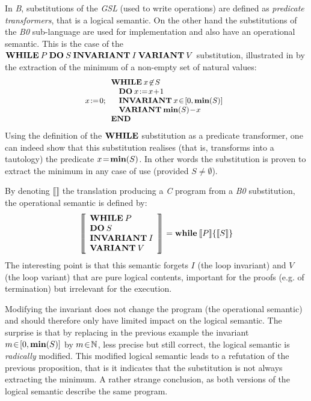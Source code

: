 \documentclass[conference]{IEEEtran}
\begin{document}
In \emph{B}, substitutions of the \emph{GSL} (used to write operations) are defined as
\emph{predicate transformers}, that is a logical semantic. On the other hand the substitutions
of the \emph{B0} sub-language are used for implementation and also have an operational
semantic. This is the case of the
{\small$\mathbf{WHILE}\:P\:\mathbf{DO}\:S\:\mathbf{INVARIANT}\:I\:\mathbf{VARIANT}\:V$} substitution,
illustrated in \cite{abr:1} by the extraction of the minimum of a non-empty set of natural
values:
\[\small\begin{array}{l}
x\!:=\!0;\begin{array}{l}\Cmd{WHILE}\:x\!\not\in\!S\\
                           \quad\Cmd{DO}\:x\!:=\!x\!+\!1\\
                           \quad\Cmd{INVARIANT}\:x\!\in\![0,\Cmd{min}(S)]\\
                           \quad\Cmd{VARIANT}\:\Cmd{min}(S)\!-\!x\\
                           \Cmd{END}\end{array}
\end{array}\]
Using the definition of the {\small$\mathbf{WHILE}$} substitution as a predicate transformer, one
can indeed show that this substitution realises (that is, transforms into a tautology) the
predicate {\small$x\!=\!\mathbf{min}(S)$}. In other words the substitution is proven to extract
the minimum in any case of use (provided {\small$S\!\not=\!\emptyset$}).

By denoting {\small$\llbracket\rrbracket$} the translation producing a \emph{C} program from a
\emph{B0} substitution, the operational semantic is defined by:
\[\begin{array}{l}
\left\llbracket
 \begin{array}{l}
 \mathbf{WHILE}\:P\\
 \mathbf{DO}\:S\\
 \mathbf{INVARIANT}\:I\\
 \mathbf{VARIANT}\:V
 \end{array}
\right\rrbracket=\mathbf{while}\:\llbracket P\rrbracket\{\llbracket S\rrbracket\}
\end{array}\]
The interesting point is that this semantic forgets {\small$I$} (the loop invariant) and
{\small$V$} (the loop variant) that are pure logical contents, important for the proofs (e.g.
of termination) but irrelevant for the execution.

Modifying the invariant does not change the program (the operational semantic) and should
therefore only have limited impact on the logical semantic. The surprise is that by replacing
in the previous example the invariant {\small$m\!\in\![0,\mathbf{min}(S)]$} by
{\small$m\!\in\!\mathbb{N}$}, less precise but still correct, the logical semantic is
\emph{radically} modified. This modified logical semantic leads to a refutation of the
previous proposition, that is it indicates that the substitution is not always extracting the
minimum. A rather strange conclusion, as both versions of the logical semantic describe the
same program.
\end{document}
